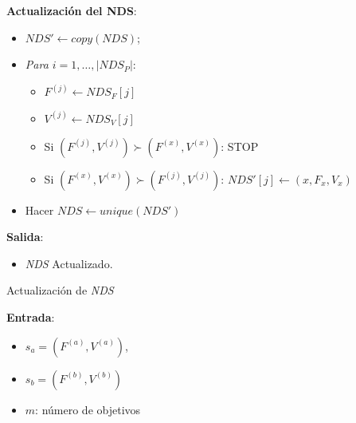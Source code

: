 \begin{itemize}
\begin{center}
\begin{minipage}[H]{0.45\linewidth}
\begin{algorithm}[H]
 \textbf{Actualización del NDS}:\\
        \begin{itemize}
        	\vspace{0.15cm}\item $NDS' \gets copy(NDS)$;
        	\vspace{0.15cm}\item \textit{Para $i=1, \dots, |NDS_P|$}:  \hspace{2.5cm}
        	\begin{itemize}
        		\vspace{0.15cm}\item $F^{(j)} \gets NDS_F[j]$
        		\vspace{0.15cm}\item $V^{(j)} \gets NDS_V[j]$
            	\vspace{0.15cm}\item Si $(F^{(j)},V^{(j)}) \succ (F^{(x)}, V^{(x)})$: STOP
            	\vspace{0.15cm}\item Si $(F^{(x)}, V^{(x)}) \succ (F^{(j)},V^{(j)})$: $NDS'[j] \gets (x, F_x, V_x)$
        	\end{itemize}
        	\vspace{0.15cm}\item Hacer $NDS \gets unique(NDS')$
        \end{itemize}
    \vspace{0.3cm} 
    
    \textbf{Salida}:
    \begin{itemize}
        \item \textit{NDS} Actualizado.
    \end{itemize}
 \caption{Actualización de \textit{NDS}}
 \label{alg:2}
\end{algorithm}
\end{minipage} \;
\begin{minipage}[H]{0.5\linewidth}
    \begin{algorithm}[H]
\SetAlgoLined
 \textbf{Entrada}:
 \begin{itemize}
 
    \vspace{0.15cm}\item $s_a = (F^{(a)}, V^{(a)})$,
     \vspace{0.15cm}\item $s_b = (F^{(b)}, V^{(b)})$
    \vspace{0.15cm}\item $m$: número de objetivos
 \end{itemize}
 

\end{algorithm}
\end{minipage}
\end{center}
\end{itemize}

